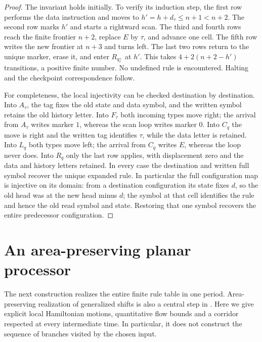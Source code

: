 \documentclass[11pt]{article}
\theoremstyle{remark}\newtheorem{remark}[theorem]{Remark}
\begin{document}
\begin{proof}
The invariant holds initially. To verify its induction step, the first row performs
the data instruction and moves to $h'=h+d_\tau\le n+1<n+2$.
The second row marks $h'$ and starts a rightward scan.  The third and
fourth rows reach the finite frontier $n+2$, replace $E$ by $\tau$,
and advance one cell.  The fifth row writes the new frontier at $n+3$
and turns left.  The last two rows return to the unique marker, erase
it, and enter $R_{q_\tau^+}$ at $h'$.  This takes
$4+2(n+2-h')$ transitions, a positive finite number.  No undefined
rule is encountered.  Halting and the checkpoint correspondence follow.

For completeness, the local injectivity can be checked destination by
destination.  Into $A_\tau$, the tag fixes the old state and data
symbol, and the written symbol retains the old history letter.  Into
$F_\tau$ both incoming types move right; the arrival from $A_\tau$
writes marker $1$, whereas the scan loop writes marker $0$.  Into
$C_q$ the move is right and the written tag identifies $\tau$, while
the data letter is retained.  Into $L_q$ both types move left; the
arrival from $C_q$ writes $E$, whereas the loop never does.  Into
$R_q$ only the last row applies, with displacement zero and the data
and history letters retained.  In every case the destination and
written full symbol recover the unique expanded rule.
In particular the full configuration map is injective on its domain:
from a destination configuration its state fixes $d$, so the old head
was at the new head minus $d$; the symbol at that cell identifies the
rule and hence the old read symbol and state.  Restoring that one
symbol recovers the entire predecessor configuration.
\end{proof}

\section{An area-preserving planar processor}\label{sec:processor}

The next construction realizes the entire finite rule table in one
period. Area-preserving realization of generalized shifts is also a
central step in \cite[Proposition~5.1]{CardonaMirandaPeraltaSalasPresas2021}.
Here we give explicit local Hamiltonian motions, quantitative flow bounds
and a corridor respected at every intermediate time.  In particular, it does not construct the sequence of branches
visited by the chosen input.
\end{document}
